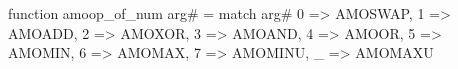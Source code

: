 function amoop_of_num arg# = match arg# {
  0 => AMOSWAP,
  1 => AMOADD,
  2 => AMOXOR,
  3 => AMOAND,
  4 => AMOOR,
  5 => AMOMIN,
  6 => AMOMAX,
  7 => AMOMINU,
  _ => AMOMAXU
}

